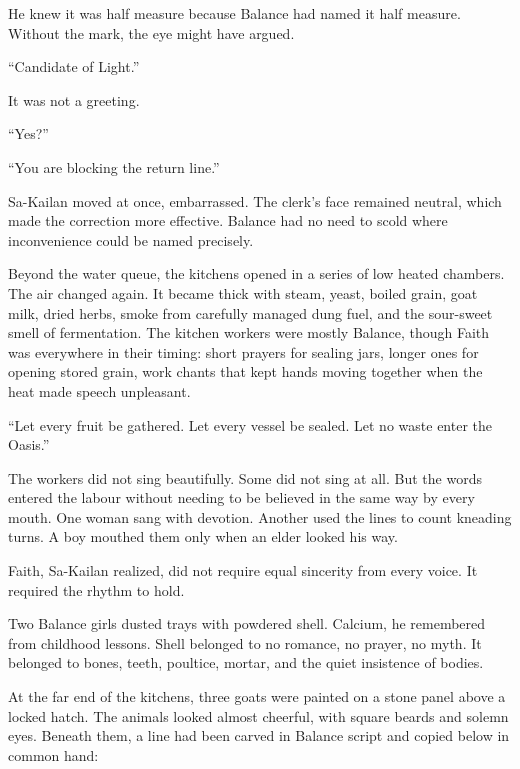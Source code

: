 He knew it was half measure because Balance had named it half measure.
Without the mark, the eye might have argued.\par

“Candidate of Light.”\par

It was not a greeting.\par

“Yes?”\par

“You are blocking the return line.”\par

Sa-Kailan moved at once, embarrassed.
The clerk’s face remained neutral, which made the correction more effective.
Balance had no need to scold where inconvenience could be named precisely.\par

Beyond the water queue, the kitchens opened in a series of low heated chambers.
The air changed again.
It became thick with steam, yeast, boiled grain, goat milk, dried herbs, smoke from carefully managed dung fuel, and the sour-sweet smell of fermentation.
The kitchen workers were mostly Balance, though Faith was everywhere in their timing: short prayers for sealing jars, longer ones for opening stored grain, work chants that kept hands moving together when the heat made speech unpleasant.\par

“Let every fruit be gathered.
Let every vessel be sealed.
Let no waste enter the Oasis.”\par

The workers did not sing beautifully.
Some did not sing at all.
But the words entered the labour without needing to be believed in the same way by every mouth.
One woman sang with devotion.
Another used the lines to count kneading turns.
A boy mouthed them only when an elder looked his way.\par

Faith, Sa-Kailan realized, did not require equal sincerity from every voice.
It required the rhythm to hold.\par

Two Balance girls dusted trays with powdered shell.
Calcium, he remembered from childhood lessons.
Shell belonged to no romance, no prayer, no myth.
It belonged to bones, teeth, poultice, mortar, and the quiet insistence of bodies.\par

At the far end of the kitchens, three goats were painted on a stone panel above a locked hatch.
The animals looked almost cheerful, with square beards and solemn eyes.
Beneath them, a line had been carved in Balance script and copied below in common hand:\par

